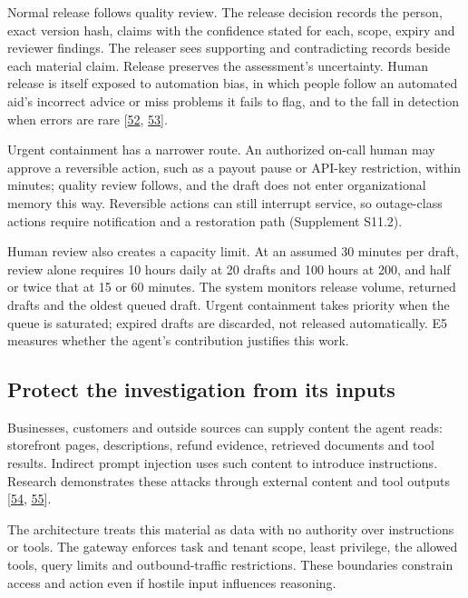 \documentclass[acmlarge,nonacm]{acmart}
\begin{document}
Normal release follows quality review. The release decision records the
person, exact version hash, claims with the confidence stated for each,
scope, expiry and reviewer findings. The releaser sees supporting and
contradicting records beside each material claim. Release preserves the
assessment's uncertainty. Human release is itself exposed to automation
bias, in which people follow an automated aid's incorrect advice or miss
problems it fails to flag, and to the fall in detection when errors are
rare {[}\protect\hyperlink{ref-ParasuramanManzey2010}{52},
\protect\hyperlink{ref-Wolfe2005Rare}{53}{]}.

Urgent containment has a narrower route. An authorized on-call human may
approve a reversible action, such as a payout pause or API-key
restriction, within minutes; quality review follows, and the draft does
not enter organizational memory this way. Reversible actions can still
interrupt service, so outage-class actions require notification and a
restoration path (Supplement S11.2).

Human review also creates a capacity limit. At an assumed 30 minutes per
draft, review alone requires 10 hours daily at 20 drafts and 100 hours
at 200, and half or twice that at 15 or 60 minutes. The system monitors
release volume, returned drafts and the oldest queued draft. Urgent
containment takes priority when the queue is saturated; expired drafts
are discarded, not released automatically. E5 measures whether the
agent's contribution justifies this work.

\hypertarget{protect-the-investigation-from-its-inputs}{%
\subsection{Protect the investigation from its
inputs}\label{protect-the-investigation-from-its-inputs}}

Businesses, customers and outside sources can supply content the agent
reads: storefront pages, descriptions, refund evidence, retrieved
documents and tool results. Indirect prompt injection uses such content
to introduce instructions. Research demonstrates these attacks through
external content and tool outputs
{[}\protect\hyperlink{ref-Greshake2023}{54},
\protect\hyperlink{ref-Debenedetti2024}{55}{]}.

The architecture treats this material as data with no authority over
instructions or tools. The gateway enforces task and tenant scope, least
privilege, the allowed tools, query limits and outbound-traffic
restrictions. These boundaries constrain access and action even if
hostile input influences reasoning.
\end{document}
